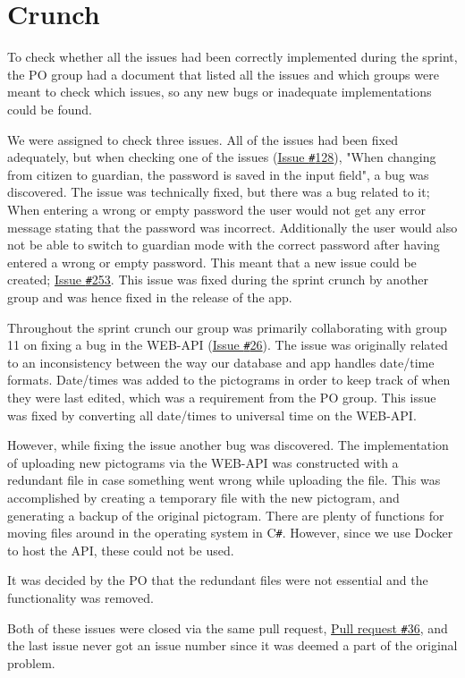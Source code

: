 \section{Crunch}
To check whether all the issues had been correctly implemented during the sprint, the PO group had a document that listed all the issues and which groups were meant to check which issues, so any new bugs or inadequate implementations could be found.

We were assigned to check three issues.
All of the issues had been fixed adequately, but when checking one of the issues (\href{https://github.com/aau-giraf/weekplanner/issues/128}{Issue \texttt{\#}128}), "When changing from citizen to guardian, the password is saved in the input field", a bug was discovered.
The issue was technically fixed, but there was a bug related to it; When entering a wrong or empty password the user would not get any error message stating that the password was incorrect.
Additionally the user would also not be able to switch to guardian mode with the correct password after having entered a wrong or empty password.
This meant that a new issue could be created; \href{https://github.com/aau-giraf/weekplanner/issues/253}{Issue \texttt{\#}253}.
This issue was fixed during the sprint crunch by another group and was hence fixed in the release of the app.

Throughout the sprint crunch our group was primarily collaborating with group 11 on fixing a bug in the WEB-API (\href{https://github.com/aau-giraf/web-api/issues/26}{Issue \texttt{\#}26}).
The issue was originally related to an inconsistency between the way our database and app handles date/time formats. 
Date/times was added to the pictograms in order to keep track of when they were last edited, which was a requirement from the PO group. 
This issue was fixed by converting all date/times to universal time on the WEB-API. 

However, while fixing the issue another bug was discovered.
The implementation of uploading new pictograms via the WEB-API was constructed with a redundant file in case something went wrong while uploading the file. 
This was accomplished by creating a temporary file with the new pictogram, and generating a backup of the original pictogram. 
There are plenty of functions for moving files around in the operating system in C\texttt{\#}. 
However, since we use Docker to host the API, these could not be used. 

It was decided by the PO that the redundant files were not essential and the functionality was removed.

Both of these issues were closed via the same pull request, \href{https://github.com/aau-giraf/web-api/pull/36}{Pull request \texttt{\#}36}, and the last issue never got an issue number since it was deemed a part of the original problem. 
